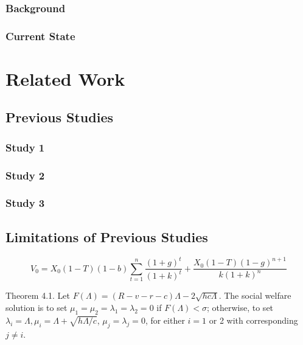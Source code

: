 \documentclass[
    writingLanguage=english, 
    addPageTitle=on,
    addDeclaration=on,
    addMUSTlog=off,
    printing=off,
    refIndent=on,
    addFigTOC=on,
    addTabTOC=on,
]{.def/must}
\begin{document}
\subsection{Background}
\citep{cohen2007, harvey2007, manguel2009, šteger2010, Villazón2011, bordwell2013, cole2013, deliot2014, foster2017, paige2017, johnson2018, wipawin2018, poff2019, giles2019, TaiwanNews2019, abdoh2019, macdonald2020, Milliot2020, OrganisationforEconomicCo2020, rothfeld2020, crotty2020, melero2021}

\subsection{Current State}

\chapter{Related Work}
\section{Previous Studies}
\subsection{Study 1}
\subsection{Study 2}
\subsection{Study 3}
\section{Limitations of Previous Studies}

\begin{equation}
V_0=X_0(1-T)(1-b) \sum_{t=1}^n \frac{(1+g)^t}{(1+k)^t}+\frac{X_0(1-T)(1-g)^{n+1}}{k(1+k)^n}
\end{equation}


\begin{axiom}
Theorem 4.1. Let $F(\Lambda)=(R-v-r-c) \Lambda-2 \sqrt{h c \Lambda}$. The social welfare solution is to set $\mu_1=\mu_2=\lambda_1=\lambda_2=0$ if $F(\Lambda)<\sigma$; otherwise, to set $\lambda_i=\Lambda, \mu_i=\Lambda+\sqrt{h \Lambda / c}$, $\mu_j=\lambda_j=0$, for either $i=1$ or 2 with corresponding $j \neq i$.
\end{axiom}
\end{document}
